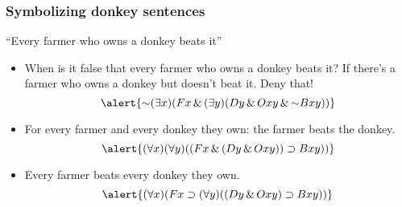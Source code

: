 \begin{frame}
    \frametitle{Symbolizing donkey sentences}

``Every farmer who owns a donkey beats it''\pauses

\begin{itemize}[<+->]
\item When is it false that every farmer who owns a donkey beats it? \pauses
If there's a farmer who owns a donkey but doesn't beat it. Deny that! \pauses
\[
\alert{\lnot\qt{\exists}{x}(F\qv{x} \land \qt{\exists}{y}(D\qv{y} \land O\qr{x}{y} \land \lnot B\qr{x}{y}))}
\]
\item For every farmer and every donkey they own: the farmer beats the donkey.
\[
\alert{\qt{\forall}{x}\qt{\forall}{y}((F\qv{x} \land (D\qv{y} \eand O\qr{x}{y})) \to B\qr{x}{y}))}
\]
\item Every farmer beats every donkey they own.
\[
\alert{\qt{\forall}{x}(F\qv{x} \to \qt{\forall}{y}((D\qv{y} \land O\qr{x}{y}) \to B\qr{x}{y}))}
\]
\end{itemize}
\end{frame}
